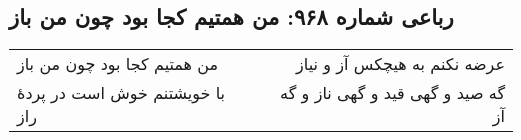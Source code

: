 \begin{center}
\section*{رباعی شماره ۹۶۸: من همتیم کجا بود چون من باز}
\label{sec:0968}
\begin{longtable}{l p{0.5cm} r}
من همتیم کجا بود چون من باز
&&
عرضه نکنم به هیچکس آز و نیاز
\\
با خویشتنم خوش است در پردهٔ راز
&&
گه صید و گهی قید و گهی ناز و گه آز
\\
\end{longtable}
\end{center}
